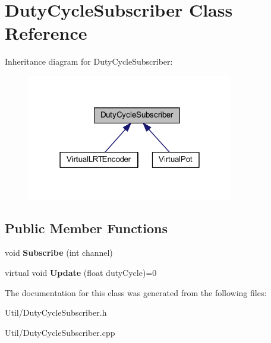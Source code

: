 \hypertarget{class_duty_cycle_subscriber}{
\section{\-Duty\-Cycle\-Subscriber \-Class \-Reference}
\label{class_duty_cycle_subscriber}
}


\-Inheritance diagram for \-Duty\-Cycle\-Subscriber\-:\nopagebreak
\begin{figure}[H]
\begin{center}
\leavevmode
\includegraphics[width=255pt]{class_duty_cycle_subscriber__inherit__graph}
\end{center}
\end{figure}
\subsection*{\-Public \-Member \-Functions}
\begin{DoxyCompactItemize}
\item 
\hypertarget{class_duty_cycle_subscriber_ad399dcdb7cc0f9f18ba124eb9fe528b2}{
void {\bfseries \-Subscribe} (int channel)}
\label{class_duty_cycle_subscriber_ad399dcdb7cc0f9f18ba124eb9fe528b2}

\item 
\hypertarget{class_duty_cycle_subscriber_a121a221d0bfee910f239b5910b92fa35}{
virtual void {\bfseries \-Update} (float duty\-Cycle)=0}
\label{class_duty_cycle_subscriber_a121a221d0bfee910f239b5910b92fa35}

\end{DoxyCompactItemize}


\-The documentation for this class was generated from the following files\-:\begin{DoxyCompactItemize}
\item 
\-Util/\-Duty\-Cycle\-Subscriber.\-h\item 
\-Util/\-Duty\-Cycle\-Subscriber.\-cpp\end{DoxyCompactItemize}
